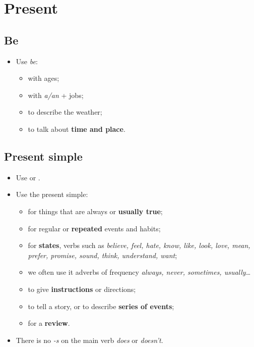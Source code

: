 \section{Present}

\subsection{Be}
\begin{itemize}
    \item Use \textit{be}:
    \begin{itemize}
        \item with ages;
        \item with \textit{a/an} + jobs;
        \item to describe the weather;
        \item to talk about \textbf{time and place}.
    \end{itemize}
\end{itemize}

\subsection{Present simple}
\begin{itemize}
    \item Use 
    or .
    \item Use the present simple:
    \begin{itemize}
        \item for things that are always or \textbf{usually true};
        \item for regular or \textbf{repeated} events and habits;
        \item for \textbf{states},  verbs such as
        \textit{believe, feel, hate, know, like, look, love, mean, prefer, promise, sound, think, understand, want};
        \item we often use it  adverbs of frequency \textit{always, never, sometimes, usually}\ldots{}
        \item[\daash] to give \textbf{instructions} or directions;
        \item[\daash] to tell a story, or to describe \textbf{series of events};
        \item[\daash] for a \textbf{review}.
    \end{itemize}
    \item There is no \textit{-s} on the main verb  \textit{does} or \textit{doesn't}.
\end{itemize}


